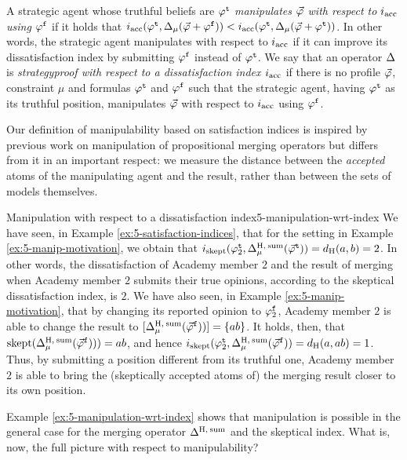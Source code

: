 A strategic agent whose truthful beliefs are $\truth{\phi}$
\emph{manipulates $\P$ with respect to $i_\acc$ using $\manip{\phi}$}
if it holds that $i_\acc(\truth{\phi}, \me_\mu(\P+\manip{\phi})) < i_\acc(\truth{\phi}, \me_\mu(\P+\truth{\phi}))$.
In other words, the strategic agent manipulates with respect to 
$i_{\acc}$ if it can improve its dissatisfaction index 
by submitting $\manip{\phi}$ instead of $\truth{\phi}$.
We say that an operator $\me$ is \emph{strategyproof with respect to a dissatisfaction index $i_\acc$} if 
there is no profile $\P$, constraint $\mu$ and formulas $\truth{\phi}$ and $\manip{\phi}$ such that 
the strategic agent, having $\truth{\phi}$ as its truthful position, 
manipulates $\P$ with respect to $i_\acc$ using $\manip{\phi}$.

Our definition of manipulability based on satisfaction indices is inspired by previous work on 
manipulation of propositional merging operators \cite{EveraereKM07}
but differs from it in an important respect:
we measure the distance between the \emph{accepted} atoms of the manipulating agent 
and the result, rather than between the sets of models themselves.

\begin{xmpl}{Manipulation with respect to a dissatisfaction index}{5-manipulation-wrt-index}
	We have seen, in Example \ref{ex:5-satisfaction-indices},
	that for the setting in Example \ref{ex:5-manip-motivation},
	we obtain that 
	$\iskept(\truth{\phi}_2, \me^{\hamming,\:\ssum}_{\mu}(\truth{\P}))=\dd_{\hamming}(a,b)=2$.
	In other words, the dissatisfaction of Academy member $2$ and 
	the result of merging when Academy member $2$ submits their
	true opinions, according to the skeptical dissatisfaction index, is $2$.
	We have also seen, in Example \ref{ex:5-manip-motivation},
	that by changing its reported opinion to $\manip{\phi}_2$,
	Academy member $2$ is able to change the result to 
	$[\me^{\hamming,\:\ssum}_{\mu}(\manip{\P}))]=\{ab\}$.
	It holds, then, that $\skept(\me^{\hamming,\:\ssum}_{\mu}(\manip{\P})))=ab$,
	and hence 
	$\iskept(\truth{\phi}_2, \me^{\hamming,\:\ssum}_{\mu}(\manip{\P}))=\dd_{\hamming}(a,ab)=1$.
	Thus, by submitting a position different from its truthful one,
	Academy member $2$ is able to bring the 
	(skeptically accepted atoms of) 
	the merging result closer to its own position.
\end{xmpl}
 
Example \ref{ex:5-manipulation-wrt-index} shows that manipulation is possible in the general case 
for the merging operator $\me^{\hamming,\:\ssum}$ and the skeptical index. 
What is, now, the full picture with respect to manipulability?

